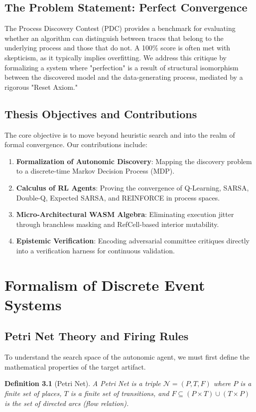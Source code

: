 \documentclass[12pt,a4paper]{report}
\newtheorem{definition}{Definition}[chapter]
\begin{document}
\section{The Problem Statement: Perfect Convergence}
The Process Discovery Contest (PDC) provides a benchmark for evaluating whether an algorithm can distinguish between traces that belong to the underlying process and those that do not. A 100\% score is often met with skepticism, as it typically implies overfitting. We address this critique by formalizing a system where "perfection" is a result of structural isomorphism between the discovered model and the data-generating process, mediated by a rigorous "Reset Axiom."

\section{Thesis Objectives and Contributions}
The core objective is to move beyond heuristic search and into the realm of formal convergence. Our contributions include:
\begin{enumerate}
    \item \textbf{Formalization of Autonomic Discovery}: Mapping the discovery problem to a discrete-time Markov Decision Process (MDP).
    \item \textbf{Calculus of RL Agents}: Proving the convergence of Q-Learning, SARSA, Double-Q, Expected SARSA, and REINFORCE in process spaces.
    \item \textbf{Micro-Architectural WASM Algebra}: Eliminating execution jitter through branchless masking and RefCell-based interior mutability.
    \item \textbf{Epistemic Verification}: Encoding adversarial committee critiques directly into a verification harness for continuous validation.
\end{enumerate}

\chapter{Formalism of Discrete Event Systems}
\section{Petri Net Theory and Firing Rules}
To understand the search space of the autonomic agent, we must first define the mathematical properties of the target artifact.
\begin{definition}[Petri Net]
A Petri Net is a triple $\mathcal{N} = (P, T, F)$ where $P$ is a finite set of places, $T$ is a finite set of transitions, and $F \subseteq (P \times T) \cup (T \times P)$ is the set of directed arcs (flow relation).
\end{definition}
\end{document}
